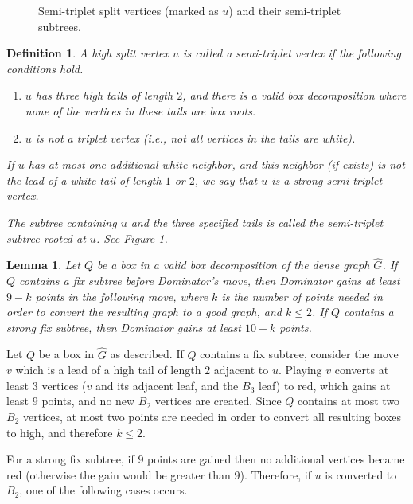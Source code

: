 \documentclass[11pt]{article}
\def\Proof{\par\noindent{\bf Proof:~}}
\def\dnsitem{\vspace{-7pt}\item}
\newtheorem{definition}[theorem]{Definition}
\newtheorem{lemma}[theorem]{Lemma}
\theoremstyle{definition}
\begin{document}
\begin{figure}[thbp]
  \caption{\sf Semi-triplet split vertices (marked as $u$) and their semi-triplet subtrees.}
  \medskip
  \centering
  \label{fig:semi_triplet_split}
\end{figure}
\begin{definition}
A high split vertex $u$ is called a \emph{semi-triplet} vertex if the following conditions hold. 
\begin{enumerate}
	\dnsitem $u$ has three high tails of length $2$, and there is a valid box decomposition where none of the vertices in these tails are box roots. 
	\dnsitem $u$ is not a triplet vertex (i.e., not all vertices in the tails are white).
\end{enumerate}

If $u$ has at most one additional white neighbor, and this neighbor (if exists) is not the lead of a white tail of length $1$ or $2$, 
we say that $u$ is a \emph{strong semi-triplet} vertex.

The subtree containing $u$ and the three specified tails is called the \emph{semi-triplet subtree rooted at $u$}. 
See Figure \ref{fig:semi_triplet_split}.
\end{definition}


\begin{lemma}
\label{lemma:fix_subtree_gain}
Let $Q$ be a box in a valid box decomposition of the dense graph $\hat{G}$.
If $Q$ contains a fix subtree before Dominator's move, then Dominator gains at least $9 - k$ points in the following move, 
where $k$ is the number of points needed in order to convert the resulting graph to a good graph, and $k \leq 2$.
If $Q$ contains a strong fix subtree, then Dominator gains at least $10 - k$ points.
\end{lemma}
\Proof
Let $Q$ be a box in $\hat{G}$ as described.
If $Q$ contains a fix subtree, consider the move $v$ which is a lead of a high tail of length $2$ adjacent to $u$.
Playing $v$ converts at least $3$ vertices ($v$ and its adjacent leaf, and the $B_3$ leaf) to red, 
which gains at least $9$ points, and no new $B_2$ vertices are created.
Since $Q$ contains at most two $B_2$ vertices, at most two points 
are needed in order to convert all resulting boxes to high, and therefore $k \leq 2$.

For a strong fix subtree, if $9$ points are gained then no additional vertices became red (otherwise the gain would be greater than $9$). 
Therefore, if $u$ is converted to $B_2$, one of the following cases occurs.
\end{document}
